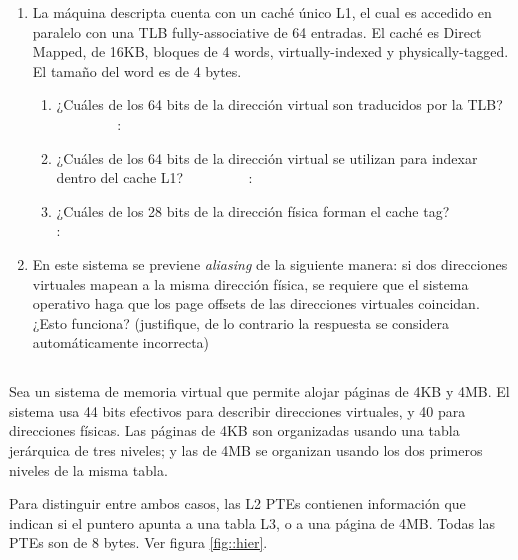 \begin{enumerate}
	\item La máquina descripta cuenta con un caché
	      único L1, el cual es accedido en paralelo con una TLB fully-associative
	      de 64 entradas. El caché es Direct Mapped, de 16KB, bloques de 4 words,
	      virtually-indexed y physically-tagged. El tamaño del word es de 4 bytes.
	      
	      \begin{enumerate}
	      \item ¿Cuáles de los 64 bits de la dirección virtual son traducidos 
		    por la TLB?
		    \underline{$\qquad\qquad$} : \underline{$\qquad\qquad$}
	      	      
	      \item ¿Cuáles de los 64 bits de la dirección virtual se utilizan para
		    indexar dentro del cache L1?
		    \underline{$\qquad\qquad$} : \underline{$\qquad\qquad$}
	      
	      \item ¿Cuáles de los 28 bits de la dirección fí­sica forman el cache tag?
		    \underline{$\qquad\qquad$} : \underline{$\qquad\qquad$}
	      	      
	      \end{enumerate}
	
	\item En este sistema se previene \emph{aliasing} de la
	      siguiente manera: si dos direcciones virtuales mapean a la misma
	      dirección fí­sica, se requiere que el sistema operativo haga que los
	      page offsets de las direcciones virtuales coincidan. ¿Esto funciona?
	      (justifique, de lo contrario la respuesta se considera automáticamente
	      incorrecta)
	
	\end{enumerate}

\subsection{}
    Sea un sistema de memoria virtual que permite alojar páginas de
    4KB y 4MB. El sistema usa 44 bits efectivos para describir direcciones
    virtuales, y 40 para direcciones físicas. Las páginas de 4KB son
    organizadas usando una tabla jerárquica de tres niveles; y las de 4MB
    se organizan usando los dos primeros niveles de la misma tabla.

    Para distinguir entre ambos casos, las L2 PTEs contienen información
    que indican si el puntero apunta a una tabla L3, o a una página de 4MB.
    Todas las PTEs son de 8 bytes. Ver figura \ref{fig::hier}.

